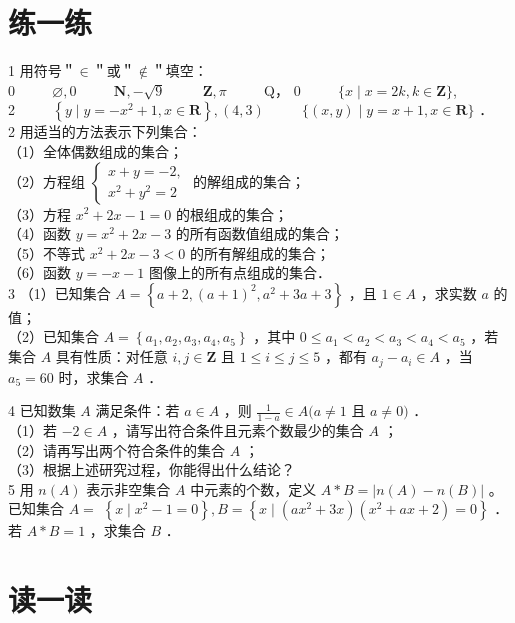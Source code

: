 \documentclass[10pt]{article}
\begin{document}
\section*{练一练}
1 用符号＂\(\in\)＂或＂\(\notin\)＂填空：\\
0 \(\qquad\) \(\varnothing, 0\) \(\qquad\) \(\mathbf{N},-\sqrt{9}\) \(\qquad\) \(\mathbf{Z}, \pi\) \(\qquad\) Q， 0 \(\qquad\) \(\{x \mid x=2 k, k \in \mathbf{Z}\}\),\\
2 \(\qquad\) \(\left\{y \mid y=-x^{2}+1, x \in \mathbf{R}\right\},(4,3)\) \(\qquad\) \(\{(x, y) \mid y=x+1, x \in \mathbf{R}\}\) ．\\
2 用适当的方法表示下列集合：\\
（1）全体偶数组成的集合；\\
（2）方程组 \(\left\{\begin{array}{l}x+y=-2, \\ x^{2}+y^{2}=2\end{array}\right.\) 的解组成的集合；\\
（3）方程 \(x^{2}+2 x-1=0\) 的根组成的集合；\\
（4）函数 \(y=x^{2}+2 x-3\) 的所有函数值组成的集合；\\
（5）不等式 \(x^{2}+2 x-3<0\) 的所有解组成的集合；\\
（6）函数 \(y=-x-1\) 图像上的所有点组成的集合．\\
3 （1）已知集合 \(A=\left\{a+2,(a+1)^{2}, a^{2}+3 a+3\right\}\) ，且 \(1 \in A\) ，求实数 \(a\) 的值；\\
（2）已知集合 \(A=\left\{a_{1}, a_{2}, a_{3}, a_{4}, a_{5}\right\}\) ，其中 \(0 \leqslant a_{1}<a_{2}<a_{3}<a_{4}<a_{5}\) ，若集合 \(A\) 具有性质：对任意 \(i, j \in \mathbf{Z}\) 且 \(1 \leqslant i \leqslant j \leqslant 5\) ，都有 \(a_{j}-a_{i} \in A\) ，当 \(a_{5}=60\) 时，求集合 \(A\) ．

4 已知数集 \(A\) 满足条件：若 \(a \in A\) ，则 \(\frac{1}{1-a} \in A(a \neq 1\) 且 \(a \neq 0)\) ．\\
（1）若 \(-2 \in A\) ，请写出符合条件且元素个数最少的集合 \(A\) ；\\
（2）请再写出两个符合条件的集合 \(A\) ；\\
（3）根据上述研究过程，你能得出什么结论？\\
5 用 \(n(A)\) 表示非空集合 \(A\) 中元素的个数，定义 \(A * B=|n(A)-n(B)|\) 。已知集合 \(A=\) \(\left\{x \mid x^{2}-1=0\right\}, B=\left\{x \mid\left(a x^{2}+3 x\right)\left(x^{2}+a x+2\right)=0\right\}\) ．若 \(A * B=1\) ，求集合 \(B\) ．

\section*{读一读}
\end{document}
